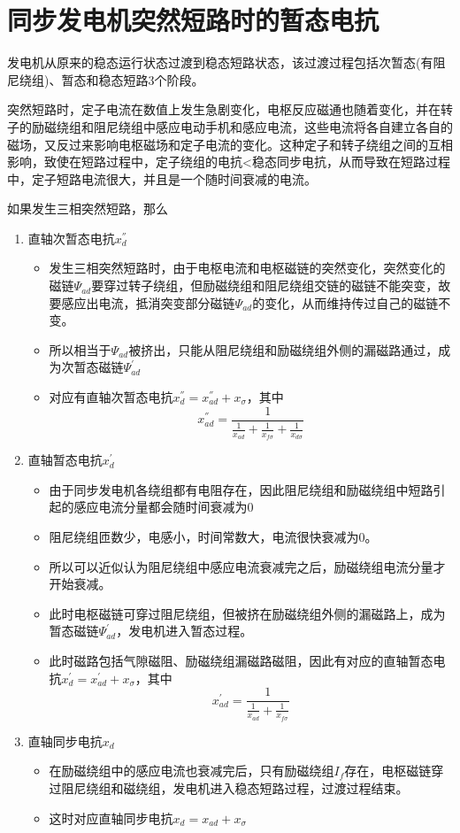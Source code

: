 \documentclass[blue]{elegantnote}
\begin{document}
\section{同步发电机突然短路时的暂态电抗}
\indent	发电机从原来的稳态运行状态过渡到稳态短路状态，该过渡过程包括次暂态(有阻尼绕组)、暂态和稳态短路3个阶段。
\begin{note}
突然短路时，定子电流在数值上发生急剧变化，电枢反应磁通也随着变化，并在转子的励磁绕组和阻尼绕组中感应电动手机和感应电流，这些电流将各自建立各自的磁场，又反过来影响电枢磁场和定子电流的变化。这种定子和转子绕组之间的互相影响，致使在短路过程中，定子绕组的电抗<稳态同步电抗，从而导致在短路过程中，定子短路电流很大，并且是一个随时间衰减的电流。
\end{note}
如果{\color{blue}发生三相突然短路}，那么
\begin{enumerate}
	\item 直轴次暂态电抗$x_d^{''}$
	\begin{itemize}
		\item 
		发生三相突然短路时，由于电枢电流和电枢磁链的突然变化，突然变化的磁链$\varPsi_{ad}$要穿过转子绕组，但{\color{blue}励磁绕组和阻尼绕组交链的磁链不能突变}，故要感应出电流，抵消突变部分磁链$\varPsi_{ad}$的变化，从而维持传过自己的磁链不变。
		\item 所以相当于$\varPsi_{ad}$被挤出，只能从阻尼绕组和励磁绕组外侧的漏磁路通过，成为次暂态磁链$\varPsi^{'}_{ad}$
		\item 对应有直轴次暂态电抗$x_d^{''}=x_{ad}^{''}+x_{\sigma}$，其中
		$$x_{ad}^{''}=\frac{1}{\frac{1}{x_{ad}}+\frac{1}{x_{f\sigma}}+\frac{1}{x_{d\sigma}}}$$
	\end{itemize}
	\item 直轴暂态电抗$x_d^{'}$
	\begin{itemize}
		\item 由于同步发电机各绕组都有电阻存在，因此阻尼绕组和励磁绕组中短路引起的感应电流分量都会随时间衰减为0
		\item 阻尼绕组匝数少，电感小，时间常数大，电流很快衰减为0。
		\item 所以可以近似认为阻尼绕组中感应电流衰减完之后，励磁绕组电流分量才开始衰减。
		\item 此时电枢磁链可穿过阻尼绕组，但被挤在励磁绕组外侧的漏磁路上，成为暂态磁链$\varPsi^{'}_{ad}$，发电机进入暂态过程。
		\item 此时磁路包括气隙磁阻、励磁绕组漏磁路磁阻，因此有对应的直轴暂态电抗$x_d^{'}=x_{ad}^{'}+x_{\sigma}$，其中
		$$x_{ad}^{'}=\frac{1}{\frac{1}{x_{ad}}+\frac{1}{x_{f\sigma}}}$$
	\end{itemize}
	\item 直轴同步电抗$x_d$
	\begin{itemize}
		\item 在励磁绕组中的感应电流也衰减完后，只有励磁绕组$I_f$存在，电枢磁链穿过阻尼绕组和磁绕组，发电机进入稳态短路过程，过渡过程结束。
		\item 这时对应直轴同步电抗$x_d=x_{ad}+x_{\sigma}$
	\end{itemize}	
\end{enumerate}
\end{document}
